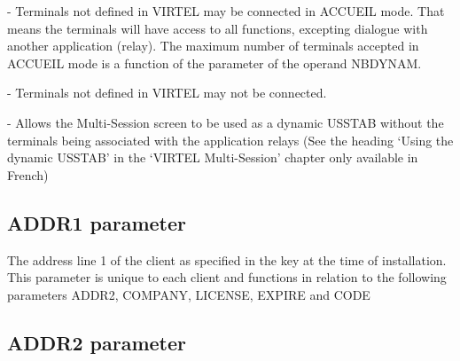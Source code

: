 \documentclass[letterpaper,10pt,english]{sphinxmanual}
\begin{document}
 - Terminals not defined in VIRTEL may be connected in ACCUEIL mode. That means the terminals will have access to all functions, excepting dialogue with another application (relay). The maximum number of terminals accepted in ACCUEIL mode is a function of the parameter of the operand NBDYNAM.

 - Terminals not defined in VIRTEL may not be connected.

 - Allows the Multi-Session screen to be used as a dynamic USSTAB without the terminals being associated with the application relays (See the heading ‘Using the dynamic USSTAB’ in the ‘VIRTEL Multi-Session’ chapter only available in French)

\ignorespaces 

\subsection{ADDR1 parameter}
\label{\detokenize{Installation_Guide:addr1-parameter}}\label{\detokenize{Installation_Guide:index-31}}
\begin{sphinxVerbatim}[commandchars=\\\{\}]
 
\end{sphinxVerbatim}

The address line 1 of the client as specified in the key at the time of installation. This parameter is unique to each client and functions in relation to the following parameters ADDR2, COMPANY, LICENSE, EXPIRE and CODE

\ignorespaces 

\subsection{ADDR2 parameter}
\label{\detokenize{Installation_Guide:addr2-parameter}}\label{\detokenize{Installation_Guide:index-32}}
\begin{sphinxVerbatim}[commandchars=\\\{\}]
 
\end{sphinxVerbatim}
\end{document}
